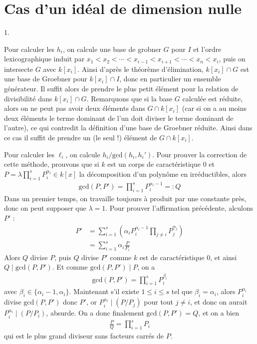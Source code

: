 \documentclass[11pt]{article}
\begin{document}
\section{Cas d'un idéal de dimension nulle}
    \begin{question}{1.}
        \item Pour calculer les $h_i$, on calcule une base de grobner $G$ pour $I$ et l'ordre lexicographique induit par $x_1 < x_2 < \cdots < x_{i-1} < x_{i+1} < \cdots < x_n < x_i$, puis on intersecte $G$ avec $k[x_i]$. Ainsi d'après le théorème d'élimination, $k[x_i] \cap G$ est une base de Groebner pour $k[x_i] \cap I$, donc en particulier un ensemble générateur. Il suffit alors de prendre le plus petit élément pour la relation de divisibilité dans $k[x_i] \cap G$. Remarquons que si la base $G$ calculée est réduite, alors on ne peut pas avoir deux éléments dans $G \cap k[x_i]$ (car si on a au moins deux éléments le terme dominant de l'un doit diviser le terme dominant de l'autre), ce qui contredit la définition d'une base de Groebner réduite. Ainsi dans ce cas il suffit de prendre un (le seul !) élément de $G \cap k[x_i]$.
        \item Pour calculer les $\ell_i$, on calcule $h_i/\mathrm{gcd}(h_i, h_i')$. Pour prouver la correction de cette méthode, prouvons que si $k$ est un corps de caractéristique $0$ et $P = \lambda \prod_{i = 1}^s P_i^{\alpha_i} \in k[x]$ la décomposition d'un polynôme en irréductibles, alors
        \begin{align*}
            \mathrm{gcd}(P,P') = \prod_{i = 1}^s P_i^{\alpha_i - 1} =: Q
        \end{align*}
        Dans un premier temps, on travaille toujours à produit par une constante près, donc on peut supposer que $\lambda = 1$. Pour prouver l'affirmation précédente, alculons $P'$ :
        \begin{align*}
            P' &= \sum_{i = 1}^s \left(\alpha_i P_i^{\alpha_i - 1}\prod_{j \neq i} P_j^{\alpha_j}\right) \\
            &= \sum_{i = 1}^s \alpha_i \frac P{P_i}
        \end{align*}
        Alors $Q$ divise $P$, puis $Q$ divise $P'$ comme $k$ est de caractéristique $0$, et ainsi $Q \mid \mathrm{gcd}(P, P')$. Et comme $\mathrm{gcd}(P,P') \mid P$, on a
        \begin{align*}
            \mathrm{gcd}(P, P') = \prod_{i = 1}^s P_i^{\beta_i}
        \end{align*}
        avec $\beta_i \in \{\alpha_i - 1, \alpha_i\}$. Maintenant s'il existe $1 \leq i \leq s$ tel que $\beta_i = \alpha_i$, alors $P_i^{\alpha_i}$ divise $\mathrm{gcd}(P,P')$ donc $P'$, or $P_i^{\alpha_i} \mid (P/P_j)$ pour tout $j \neq i$, et donc on aurait $P_i^{\alpha_i} \mid (P/P_i)$, absurde. On a donc finalement $\mathrm{gcd}(P,P') = Q$, et on a bien
        \begin{align*}
            \frac PQ = \prod_{i = 1}^s P_i
        \end{align*}
        qui est le plus grand diviseur sans facteurs carrés de $P$.
    \end{question}
\end{document}
